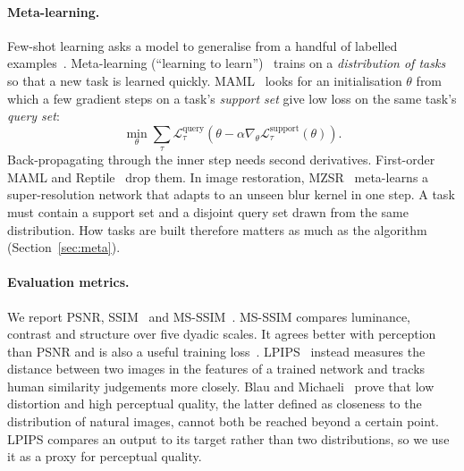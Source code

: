 \paragraph{Meta-learning.}
Few-shot learning asks a model to generalise from a handful of labelled examples~\cite{parnami2022fewshot}. Meta-learning (``learning to learn'')~\cite{hospedales2021metasurvey} trains on a \emph{distribution of tasks} so that a new task is learned quickly. MAML~\cite{finn2017maml} looks for an initialisation $\theta$ from which a few gradient steps on a task's \emph{support set} give low loss on the same task's \emph{query set}:
\begin{equation}
\min_\theta \sum_{\tau} \mathcal{L}^{\text{query}}_\tau\!\left(\theta - \alpha \nabla_\theta \mathcal{L}^{\text{support}}_\tau(\theta)\right).
\label{eq:maml}
\end{equation}
Back-propagating through the inner step needs second derivatives. First-order MAML and Reptile~\cite{nichol2018reptile} drop them. In image restoration, MZSR~\cite{soh2020mzsr} meta-learns a super-resolution network that adapts to an unseen blur kernel in one step. A task must contain a support set and a disjoint query set drawn from the same distribution. How tasks are built therefore matters as much as the algorithm (Section~\ref{sec:meta}).

\paragraph{Evaluation metrics.}
We report PSNR, SSIM~\cite{wang2004ssim} and MS-SSIM~\cite{wang2003msssim}. MS-SSIM compares luminance, contrast and structure over five dyadic scales. It agrees better with perception than PSNR and is also a useful training loss~\cite{zhao2017losses}. LPIPS~\cite{zhang2018lpips} instead measures the distance between two images in the features of a trained network and tracks human similarity judgements more closely. Blau and Michaeli~\cite{blau2018perception} prove that low distortion and high perceptual quality, the latter defined as closeness to the distribution of natural images, cannot both be reached beyond a certain point. LPIPS compares an output to its target rather than two distributions, so we use it as a proxy for perceptual quality.

